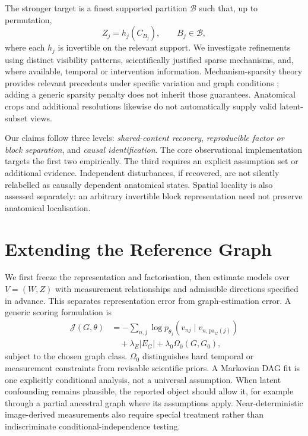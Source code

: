 \documentclass[10pt,twocolumn,letterpaper]{article}
\newcommand{\pa}{\mathrm{pa}}
\begin{document}
The stronger target is a finest supported partition $\mathcal B$ such that, up to permutation,
\begin{equation}
 Z_j=h_j(C_{B_j}),\qquad B_j\in\mathcal B,
 \label{eq:blocktarget}
\end{equation}
where each $h_j$ is invertible on the relevant support. We investigate refinements using distinct visibility patterns, scientifically justified sparse mechanisms, and, where available, temporal or intervention information. Mechanism-sparsity theory provides relevant precedents under specific variation and graph conditions \cite{lachapelle2022}; adding a generic sparsity penalty does not inherit those guarantees. Anatomical crops and additional resolutions likewise do not automatically supply valid latent-subset views.

Our claims follow three levels: \emph{shared-content recovery}, \emph{reproducible factor or block separation}, and \emph{causal identification}. The core observational implementation targets the first two empirically. The third requires an explicit assumption set or additional evidence. Independent disturbances, if recovered, are not silently relabelled as causally dependent anatomical states. Spatial locality is also assessed separately: an arbitrary invertible block representation need not preserve anatomical localisation.

\section{Extending the Reference Graph}
\label{sec:graph}

We first freeze the representation and factorisation, then estimate models over $V=(W,Z)$ with measurement relationships and admissible directions specified in advance. This separates representation error from graph-estimation error. A generic scoring formulation is
\begin{align}
 \mathcal J(G,\theta)&=-\sum_{n,j}\log p_{\theta_j}
       (v_{nj}\mid v_{n,\pa_G(j)})\nonumber\\
 &\quad+\lambda_E|E_G|+\lambda_0\Omega_0(G,G_0),
 \label{eq:graphscore}
\end{align}
subject to the chosen graph class. $\Omega_0$ distinguishes hard temporal or measurement constraints from revisable scientific priors. A Markovian DAG fit is one explicitly conditional analysis, not a universal assumption. When latent confounding remains plausible, the reported object should allow it, for example through a partial ancestral graph where its assumptions apply. Near-deterministic image-derived measurements also require special treatment rather than indiscriminate conditional-independence testing.
\end{document}
